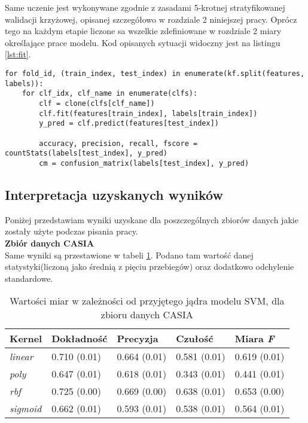 Same uczenie jest wykonywane zgodnie z zasadami 5-krotnej stratyfikowanej walidacji krzyżowej, opisanej szczegółowo w rozdziale 2 niniejszej pracy. Oprócz tego na każdym etapie liczone sa wszelkie zdefiniowane w rozdziale 2 miary określające prace modelu. Kod opisanych sytuacji widoczny jest na listingu \ref{lst:fit}.

\begin{lstlisting}[caption={Implementacja trenowanie modelów z zastosowaniem 5-krotnej startyfikowanej walidacji krzyżowej}, label={lst:fit}]
for fold_id, (train_index, test_index) in enumerate(kf.split(features, labels)):
	for clf_idx, clf_name in enumerate(clfs):
		clf = clone(clfs[clf_name])
		clf.fit(features[train_index], labels[train_index])
		y_pred = clf.predict(features[test_index])

		accuracy, precision, recall, fscore = countStats(labels[test_index], y_pred)
		cm = confusion_matrix(labels[test_index], y_pred)
\end{lstlisting}

\subsection{Interpretacja uzyskanych wyników}

Poniżej przedstawiam wyniki uzyskane dla poszczególnych zbiorów danych jakie zostały użyte podczas pisania pracy. \\

\textbf{Zbiór danych CASIA} \\

Same wyniki są przestawione w tabeli \ref{tab:result}. Podano tam wartość danej statystyki(liczoną jako średnią z pięciu przebiegów) oraz dodatkowo odchylenie standardowe.
\begin{table}[h!]
	\centering
	\begin{tabular}{|l|l|l|l|l|}
		\hline
		\textbf{Kernel} & \textbf{Dokładność} & \textbf{Precyzja} & \textbf{Czułość} & \textbf{Miara \textit{F}} \\ \hline
		\textit{linear}  & 0.710 (0.01) & 0.664 (0.01) & 0.581 (0.01) & 0.619 (0.01) \\ \hline
		\textit{poly}    & 0.647 (0.01) & 0.618 (0.01) & 0.343 (0.01) & 0.441 (0.01) \\ \hline
		\textit{rbf}     & 0.725 (0.00) & 0.669 (0.00) & 0.638 (0.01) & 0.653 (0.00) \\ \hline
		\textit{sigmoid} & 0.662 (0.01) & 0.593 (0.01) & 0.538 (0.01) & 0.564 (0.01) \\ \hline
	\end{tabular}
	\caption{Wartości miar w zależności od przyjętego jądra modelu SVM, dla zbioru danych CASIA}
	\label{tab:result}
\end{table}

